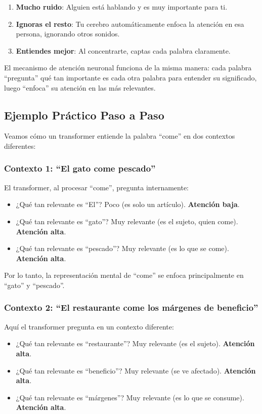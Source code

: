 \begin{enumerate}[leftmargin=*]
    \item \textbf{Mucho ruido}: Alguien está hablando y es muy importante para ti.
    \item \textbf{Ignoras el resto}: Tu cerebro automáticamente enfoca la atención en esa persona, ignorando otros sonidos.
    \item \textbf{Entiendes mejor}: Al concentrarte, captas cada palabra claramente.
\end{enumerate}

El mecanismo de atención neuronal funciona de la misma manera: cada palabra ``pregunta'' qué tan importante es cada otra palabra para entender su significado, luego ``enfoca'' su atención en las más relevantes.

\subsection{Ejemplo Práctico Paso a Paso}

Veamos cómo un transformer entiende la palabra ``come'' en dos contextos diferentes:

\subsubsection{Contexto 1: ``El gato come pescado''}

El transformer, al procesar ``come'', pregunta internamente:
\begin{itemize}[leftmargin=*]
    \item ¿Qué tan relevante es ``El''? Poco (es solo un artículo). \textbf{Atención baja}.
    \item ¿Qué tan relevante es ``gato''? Muy relevante (es el sujeto, quien come). \textbf{Atención alta}.
    \item ¿Qué tan relevante es ``pescado''? Muy relevante (es lo que se come). \textbf{Atención alta}.
\end{itemize}

Por lo tanto, la representación mental de ``come'' se enfoca principalmente en ``gato'' y ``pescado''.

\subsubsection{Contexto 2: ``El restaurante come los márgenes de beneficio''}

Aquí el transformer pregunta en un contexto diferente:
\begin{itemize}[leftmargin=*]
    \item ¿Qué tan relevante es ``restaurante''? Muy relevante (es el sujeto). \textbf{Atención alta}.
    \item ¿Qué tan relevante es ``beneficio''? Muy relevante (se ve afectado). \textbf{Atención alta}.
    \item ¿Qué tan relevante es ``márgenes''? Muy relevante (es lo que se consume). \textbf{Atención alta}.
\end{itemize}

